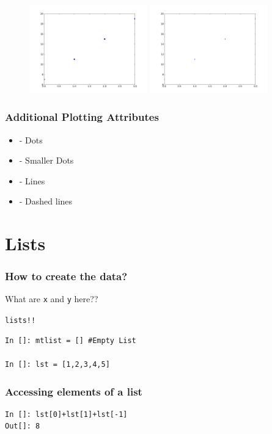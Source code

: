 \documentclass[14pt,compress]{beamer}
\newcommand{\typ}[1]{\lstinline{#1}}
\newcommand{\kwrd}[1]{ \texttt{\textbf{\color{blue}{#1}}}  }
\begin{document}
\begin{frame}[fragile]
\begin{figure}
\includegraphics[width=2in]{data/stline_dots.png}
\includegraphics[width=2in]{data/stline_points.png}
\end{figure}
\end{frame}

\begin{frame}[fragile]
\frametitle{Additional Plotting Attributes}
\begin{itemize}
  \item \kwrd{'o'} - Dots
  \item \kwrd{'.'} - Smaller Dots
  \item \kwrd{'-'} - Lines
  \item \kwrd{'- -'} - Dashed lines
\end{itemize}
\end{frame}

\section{Lists}
\begin{frame}[fragile]
  \frametitle{How to create the data?}
What are \typ{x} and \typ{y} here??\\
\begin{center}
\alert{\typ{lists!!}}
\end{center}
\begin{lstlisting}
In []: mtlist = [] #Empty List

In []: lst = [1,2,3,4,5] 
\end{lstlisting}
\end{frame}

\begin{frame}[fragile]
\frametitle{Accessing elements of a list}
\begin{lstlisting}
In []: lst[0]+lst[1]+lst[-1]
Out[]: 8
\end{lstlisting}
\end{frame}
\end{document}
